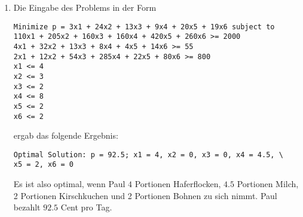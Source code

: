 \documentclass[a4paper]{scrartcl}
\begin{document}
\begin{enumerate}[label=\bfseries\arabic*.]
\begin{enumerate}
            \item
                Die Eingabe des Problems in der Form
                \begin{verbatim}
Minimize p = 3x1 + 24x2 + 13x3 + 9x4 + 20x5 + 19x6 subject to
110x1 + 205x2 + 160x3 + 160x4 + 420x5 + 260x6 >= 2000
4x1 + 32x2 + 13x3 + 8x4 + 4x5 + 14x6 >= 55
2x1 + 12x2 + 54x3 + 285x4 + 22x5 + 80x6 >= 800
x1 <= 4
x2 <= 3
x3 <= 2
x4 <= 8
x5 <= 2
x6 <= 2 \end{verbatim}
                ergab das folgende Ergebnis:
                \begin{verbatim}
Optimal Solution: p = 92.5; x1 = 4, x2 = 0, x3 = 0, x4 = 4.5, \
x5 = 2, x6 = 0 \end{verbatim}
                Es ist also optimal, wenn Paul $4$ Portionen Haferflocken,
                $4.5$ Portionen Milch, 2 Portionen Kirschkuchen und 2 Portionen
                Bohnen zu sich nimmt.
                Paul bezahlt $92.5$ Cent pro Tag.

        \end{enumerate}

\end{enumerate}
\end{document}
